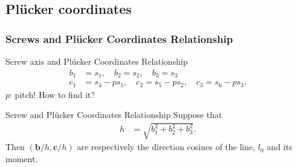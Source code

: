 \subsection{Pl{\"u}cker coordinates}
\begin{frame}
	\frametitle{Screws and Pl{\"u}cker Coordinates Relationship}
	\begin{block}{Screw axis and Pl{\"u}cker Coordinates Relationship}
		\begin{align}
			b_1 &= s_1, \quad b_2 = s_2, \quad b_3 = s_3 \\
			c_1 &= s_4 - ps_1, \quad c_2 = s_5-ps_2, \quad c_3 = s_6 - ps_3.
		\end{align}
	$p$: pitch! How to find it?
	\end{block}
	\begin{block}{Screw and Pl{\"u}cker Coordinates Relationship}
		Suppose that 
		\begin{align}
			h &= \sqrt{b_1^2+b_2^2+b_3^2}.
		\end{align}
		Then $(\bm{b}/h, \bm{c}/h)$ are respectively the direction cosines of the line, $l_0$ and its moment.
	\end{block}
\end{frame}

